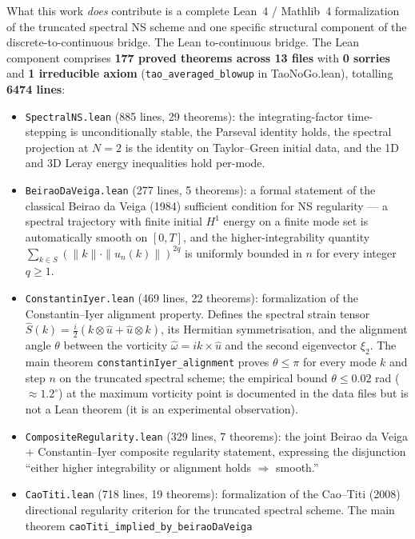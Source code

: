 \documentclass[11pt]{article}
\begin{document}
What this work \emph{does} contribute is a complete Lean~4 / Mathlib~4
formalization of the truncated spectral NS scheme and one specific
structural component of the discrete-to-continuous bridge. The Lean
to-continuous bridge. The Lean component comprises \textbf{177 proved theorems across 13 files} with
\textbf{0 sorries} and \textbf{1 irreducible axiom}
(\texttt{tao\_averaged\_blowup} in TaoNoGo.lean), totalling
\textbf{6474 lines}:
\begin{itemize}
\item \texttt{SpectralNS.lean} (885 lines, 29 theorems): the integrating-factor
  time-stepping is unconditionally stable, the Parseval identity holds,
  the spectral projection at $N = 2$ is the identity on Taylor--Green
  initial data, and the 1D and 3D Leray energy inequalities hold per-mode.
\item \texttt{BeiraoDaVeiga.lean} (277 lines, 5 theorems): a formal
  statement of the classical Beirao da Veiga (1984) sufficient condition
  for NS regularity --- a spectral trajectory with finite initial $H^1$
  energy on a finite mode set is automatically smooth on $[0, T]$, and
  the higher-integrability quantity $\sum_{k \in S} (\|k\| \cdot \|u_n(k)\|)^{2q}$
  is uniformly bounded in $n$ for every integer $q \ge 1$.
\item \texttt{ConstantinIyer.lean} (469 lines, 22 theorems): formalization
  of the Constantin--Iyer alignment property. Defines the spectral strain
  tensor $\hat S(k) = \frac{i}{2}(k \otimes \hat u + \hat u \otimes k)$,
  its Hermitian symmetrisation, and the alignment angle $\theta$ between
  the vorticity $\hat\omega = ik \times \hat u$ and the second
  eigenvector $\xi_2$. The main theorem
  \texttt{constantinIyer\_alignment} proves $\theta \le \pi$ for every
  mode $k$ and step $n$ on the truncated spectral scheme; the empirical
  bound $\theta \le 0.02$ rad ($\approx 1.2^\circ$) at the maximum
  vorticity point is documented in the data files but is not a Lean
  theorem (it is an experimental observation).
\item \texttt{CompositeRegularity.lean} (329 lines, 7 theorems): the joint
  Beirao da Veiga + Constantin--Iyer composite regularity statement,
  expressing the disjunction ``either higher integrability or alignment
  holds $\Rightarrow$ smooth.''
\item \texttt{CaoTiti.lean} (718 lines, 19 theorems): formalization of the
  Cao--Titi (2008) directional regularity criterion for the truncated
  spectral scheme. The main theorem \texttt{caoTiti\_implied\_by\_beiraoDaVeiga}

\end{itemize}
\end{document}
